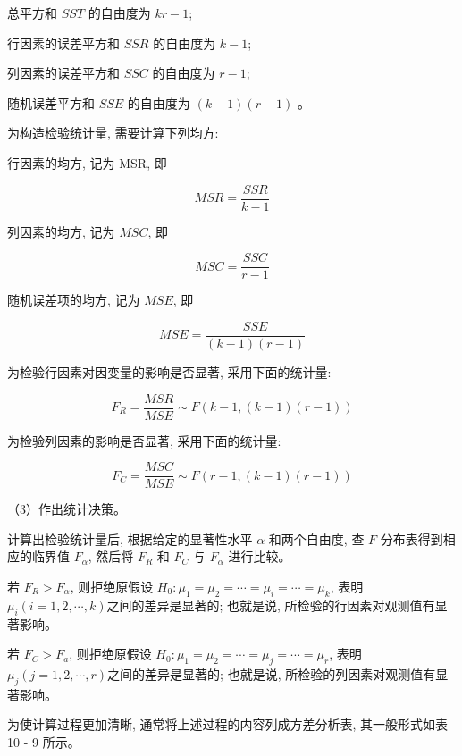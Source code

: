 \documentclass[10pt]{article}
\begin{document}
\begin{CJK*}{UTF8}{bsmi}
总平方和 $S S T$ 的自由度为 $k r-1$;

行因素的误差平方和 $S S R$ 的自由度为 $k-1$;

列因素的误差平方和 $S S C$ 的自由度为 $r-1$;

随机误差平方和 $S S E$ 的自由度为 $(k-1)(r-1)$ 。

为构造检验统计量, 需要计算下列均方:

行因素的均方, 记为 MSR, 即


\begin{equation*}
M S R=\frac{S S R}{k-1} \tag{10.20}
\end{equation*}


列因素的均方, 记为 $M S C$, 即


\begin{equation*}
M S C=\frac{S S C}{r-1} \tag{10.21}
\end{equation*}


随机误差项的均方, 记为 $M S E$, 即


\begin{equation*}
M S E=\frac{S S E}{(k-1)(r-1)} \tag{10.22}
\end{equation*}


为检验行因素对因变量的影响是否显著, 采用下面的统计量:


\begin{equation*}
F_{R}=\frac{M S R}{M S E} \sim F(k-1,(k-1)(r-1)) \tag{10.23}
\end{equation*}


为检验列因素的影响是否显著, 采用下面的统计量:


\begin{equation*}
F_{C}=\frac{M S C}{M S E} \sim F(r-1,(k-1)(r-1)) \tag{10.24}
\end{equation*}


（3）作出统计决策。

计算出检验统计量后, 根据给定的显著性水平 $\alpha$ 和两个自由度, 查 $F$ 分布表得到相应的临界值 $F_{\alpha}$, 然后将 $F_{R}$ 和 $F_{C}$ 与 $F_{\alpha}$ 进行比较。

若 $F_{R}>F_{\alpha}$, 则拒绝原假设 $H_{0}: \mu_{1}=\mu_{2}=\cdots=\mu_{i}=\cdots=\mu_{k}$, 表明 $\mu_{i}(i=1,2, \cdots, k)$之间的差异是显著的; 也就是说, 所检验的行因素对观测值有显著影响。

若 $F_{C}>F_{a}$, 则拒绝原假设 $H_{0}: \mu_{1}=\mu_{2}=\cdots=\mu_{j}=\cdots=\mu_{r}$, 表明 $\mu_{j}(j=1,2, \cdots, r)$之间的差异是显著的; 也就是说, 所检验的列因素对观测值有显著影响。

为使计算过程更加清晰, 通常将上述过程的内容列成方差分析表, 其一般形式如表 10 - 9 所示。


\end{CJK*}
\end{document}
